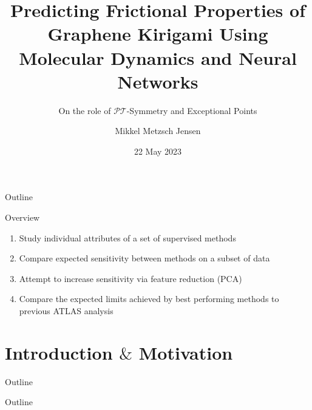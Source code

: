 \documentclass[UKenglish,Serif]{beamer}
\author{Mikkel Metzsch Jensen}
\title{Predicting Frictional Properties of Graphene Kirigami Using Molecular Dynamics and Neural Networks}
\subtitle{On the role of $\mathcal{PT}$-Symmetry and Exceptional Points}
\date{22 May 2023}
\begin{document}
\begin{frame}{Outline}
    \tableofcontents
\end{frame}

\begin{frame}{Overview}
    \begin{enumerate}
        \item Study individual attributes of a set of supervised methods 
        \item Compare expected sensitivity between methods on a subset of data
        \item Attempt to increase sensitivity via feature reduction (PCA)
        \item Compare the expected limits achieved by best performing methods 
              to previous ATLAS analysis
    \end{enumerate}
\end{frame}
\section{Introduction $\&$ Motivation}
\begin{frame}{Outline}
    \tableofcontents[currentsection]
\end{frame}



%
%




\begin{frame}{Outline}
    \tableofcontents
\end{frame}
\end{document}
